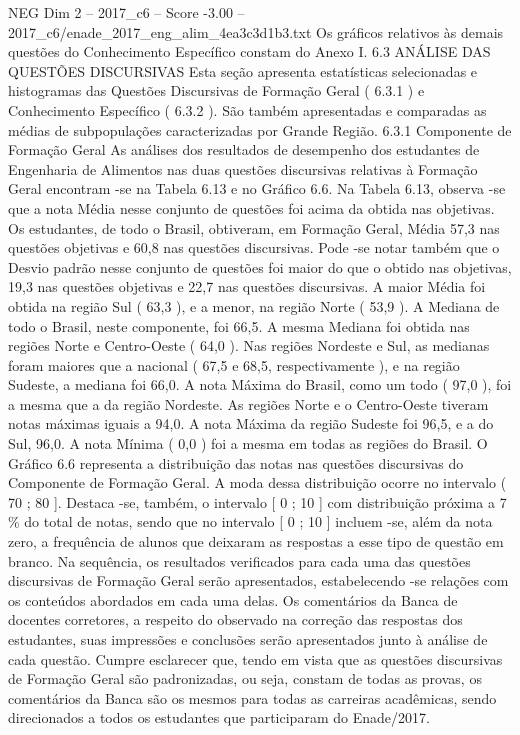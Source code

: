 \begin{textsample}{NEG Dim 2 – 2017\_c6 – Score -3.00 – 2017\_c6/enade\_2017\_eng\_alim\_4ea3c3d1b3.txt}
Os gráficos relativos às demais questões do Conhecimento Específico constam do Anexo I. 6.3 ANÁLISE DAS QUESTÕES DISCURSIVAS Esta seção apresenta estatísticas selecionadas e histogramas das Questões Discursivas de Formação Geral ( 6.3.1 ) e Conhecimento Específico ( 6.3.2 ).
São também apresentadas e comparadas as médias de subpopulações caracterizadas por Grande Região. 6.3.1 Componente de Formação Geral As análises dos resultados de desempenho dos estudantes de Engenharia de Alimentos nas duas questões discursivas relativas à Formação Geral encontram -se na Tabela 6.13 e no Gráfico 6.6.
Na Tabela 6.13, observa -se que a nota Média nesse conjunto de questões foi acima da obtida nas objetivas.
Os estudantes, de todo o Brasil, obtiveram, em Formação Geral, Média 57,3 nas questões objetivas e 60,8 nas questões discursivas.
Pode -se notar também que o Desvio padrão nesse conjunto de questões foi maior do que o obtido nas objetivas, 19,3 nas questões objetivas e 22,7 nas questões discursivas.
A maior Média foi obtida na região Sul ( 63,3 ), e a menor, na região Norte ( 53,9 ).
A Mediana de todo o Brasil, neste componente, foi 66,5.
A mesma Mediana foi obtida nas regiões Norte e Centro-Oeste ( 64,0 ).
Nas regiões Nordeste e Sul, as medianas foram maiores que a nacional ( 67,5 e 68,5, respectivamente ), e na região Sudeste, a mediana foi 66,0.
A nota Máxima do Brasil, como um todo ( 97,0 ), foi a mesma que a da região Nordeste.
As regiões Norte e o Centro-Oeste tiveram notas máximas iguais a 94,0.
A nota Máxima da região Sudeste foi 96,5, e a do Sul, 96,0.
A nota Mínima ( 0,0 ) foi a mesma em todas as regiões do Brasil.
O Gráfico 6.6 representa a distribuição das notas nas questões discursivas do Componente de Formação Geral.
A moda dessa distribuição ocorre no intervalo ( 70 ; 80 ].
Destaca -se, também, o intervalo [ 0 ; 10 ] com distribuição próxima a 7 \% do total de notas, sendo que no intervalo [ 0 ; 10 ] incluem -se, além da nota zero, a frequência de alunos que deixaram as respostas a esse tipo de questão em branco.
Na sequência, os resultados verificados para cada uma das questões discursivas de Formação Geral serão apresentados, estabelecendo -se relações com os conteúdos abordados em cada uma delas.
Os comentários da Banca de docentes corretores, a respeito do observado na correção das respostas dos estudantes, suas impressões e conclusões serão apresentados junto à análise de cada questão.
Cumpre esclarecer que, tendo em vista que as questões discursivas de Formação Geral são padronizadas, ou seja, constam de todas as provas, os comentários da Banca são os mesmos para todas as carreiras acadêmicas, sendo direcionados a todos os estudantes que participaram do Enade/2017.

\end{textsample}
